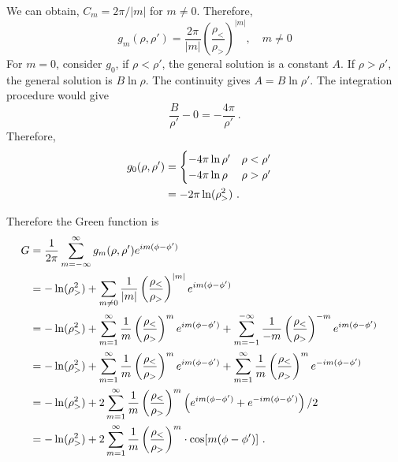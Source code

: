 \documentclass[12pt]{article}
\begin{document}
We can obtain, $C_m = 2\pi /|m|$ for $m \neq 0$. Therefore,
\begin{equation}
    g_m(\rho, \rho') = \frac{2\pi}{|m|} \left(\frac{\rho_<}{\rho_>}\right)^{|m|}, \quad m \neq 0
\end{equation}
For $m = 0$, consider $g_0$, if $\rho < \rho'$, the general solution is a constant $A$. If $\rho > \rho'$, the general solution is $B \ln \rho$. The continuity gives $A = B \ln \rho'$. The integration procedure would give
\begin{equation}
    \frac{B}{\rho'} - 0 = - \frac{4\pi}{\rho'}~.
\end{equation}
Therefore,
\begin{align}
    g_0(\rho, \rho') &= \begin{cases}
        -4\pi \ln \rho' & \rho < \rho'\\
        -4\pi \ln \rho & \rho > \rho'
    \end{cases}\cr
    &=-2 \pi \ln (\rho_>^2)~.
\end{align}

Therefore the Green function is
\begin{align}
    G&= \frac{1}{2\pi} \sum_{m = - \infty}^\infty g_m(\rho, \rho') e^{im(\phi - \phi')} \cr
    &= - \ln (\rho^2_>) + \sum_{m \neq 0} \frac1{|m|} \left(\frac{\rho_<}{\rho_>}\right)^{|m|} e^{im(\phi - \phi')} \cr
    & = - \ln (\rho^2_>) + \sum_{m = 1}^\infty \frac1{m} \left(\frac{\rho_<}{\rho_>}\right)^{m} e^{im(\phi - \phi')} + \sum_{m = -1}^{-\infty} \frac1{-m} \left(\frac{\rho_<}{\rho_>}\right)^{-m} e^{im(\phi - \phi')}\cr
    & = - \ln (\rho^2_>) + \sum_{m = 1}^\infty \frac1{m} \left(\frac{\rho_<}{\rho_>}\right)^{m} e^{im(\phi - \phi')} + \sum_{m = 1}^{\infty} \frac1{m} \left(\frac{\rho_<}{\rho_>}\right)^{m} e^{-im(\phi - \phi')}\cr
    & = - \ln (\rho^2_>) + 2\sum_{m = 1}^\infty \frac1{m} \left(\frac{\rho_<}{\rho_>}\right)^{m} \left(e^{im(\phi - \phi')} +  e^{-im(\phi - \phi')} \right)/2\cr
    & = - \ln (\rho^2_>) + 2\sum_{m = 1}^\infty \frac1{m} \left(\frac{\rho_<}{\rho_>}\right)^{m} \cdot \cos[m(\phi - \phi')]~.
\end{align}
\end{document}

